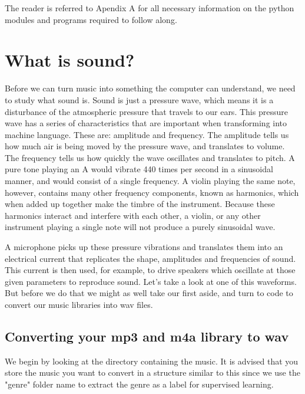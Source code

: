 \documentclass[12pt]{article}
\begin{document}
The reader is referred to Apendix A for all necessary information on the python modules and programs required to follow along.
 

\section*{What is sound?}
Before we can turn music into something the computer can understand, we need to study what sound is. Sound is just a pressure wave, which means it is a disturbance of the atmospheric pressure that travels to our ears. This pressure wave has a series of characteristics that are important when transforming into machine language. These are: amplitude and frequency. The amplitude tells us how much air is being moved by the pressure wave, and translates to volume. The frequency tells us how quickly the wave oscillates and translates to pitch. A pure tone playing an A would vibrate 440 times per second in a sinusoidal manner, and would consist of a single frequency. A violin playing the same note, however, contains many other frequency components, known as harmonics, which when added up together make the timbre of the instrument. Because these harmonics interact and interfere with each other, a violin, or any other instrument playing a single note will not produce a purely sinusoidal wave. 
\medskip

A microphone picks up these pressure vibrations and translates them into an electrical current that replicates the shape, amplitudes and frequencies of sound. This current is then used, for example, to drive speakers which oscillate at those given parameters to reproduce sound.  Let's take a look at one of this waveforms. But before we do that we might as well take our first aside, and turn to code to convert our music libraries into wav files.

\subsection*{Converting your mp3 and m4a library to wav}

We begin by looking at the directory containing the music. It is advised that you store the music you want to convert in a structure  similar to this since we use the "genre" folder name to extract the genre as a label for supervised learning.

\medskip
	\begin{center}
    \begin{minipage}{0.5\textwidth}
    \end{minipage}%
    \begin{minipage}{0.5\textwidth}
    \medskip
    \end{minipage}
	\end{center}
\end{document}
